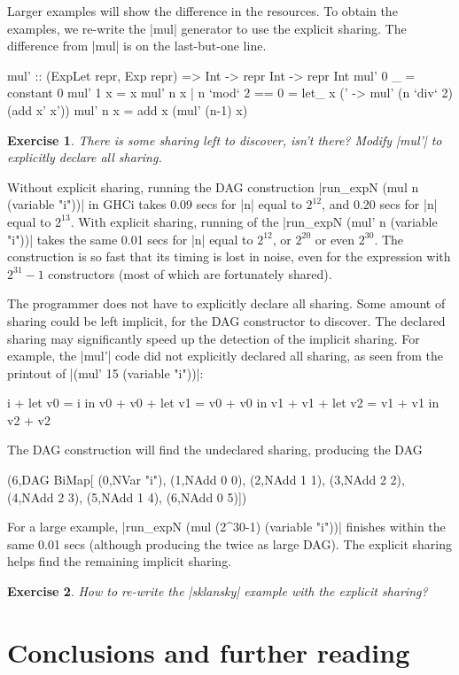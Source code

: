\documentclass[submission,copyright,creativecommons]{eptcs}
\newtheorem{Exercise}{Exercise} \newcommand\aside[1]{}
\begin{document}
Larger examples will show the difference in the resources. To
obtain the examples, we re-write the |mul| generator to use the
explicit sharing.  The difference from |mul| is on the last-but-one
line.
\begin{code}
mul' :: (ExpLet repr, Exp repr) => Int -> repr Int -> repr Int
mul' 0 _ = constant 0
mul' 1 x = x
mul' n x | n `mod` 2 == 0 = let_ x (\x' -> mul' (n `div` 2) (add x' x'))
mul' n x = add x (mul' (n-1) x)
\end{code}
\begin{Exercise}
There is some sharing left to discover, isn't there?
Modify |mul'| to explicitly declare all sharing.
\end{Exercise}
Without explicit sharing, running the DAG construction 
|run_expN (mul n (variable "i"))| in GHCi takes 0.09 secs for
|n| equal to $2^{12}$, and 0.20 secs for |n| equal to $2^{13}$.
With explicit sharing, running of the
|run_expN (mul' n (variable "i"))| takes the same 0.01 secs
for |n| equal to $2^{12}$, or $2^{20}$ or even $2^{30}$. The
construction is so fast that its timing is lost in noise, even for
the expression with $2^{31}-1$ constructors (most of which are
fortunately shared).

The programmer does not have to explicitly declare all sharing. Some
amount of sharing could be left implicit, for the DAG constructor to
discover. The declared sharing may significantly speed up the
detection of the implicit sharing. For example, the |mul'| code did
not explicitly declared all sharing, as seen from the printout of
|(mul' 15 (variable "i"))|:
\begin{code}
i + let v0 = i in v0 + v0 + 
      let v1 = v0 + v0 in v1 + v1 + let v2 = v1 + v1 in v2 + v2
\end{code}
The DAG construction will find the undeclared sharing, producing the DAG
\begin{code}
(6,DAG BiMap[
   (0,NVar "i"),
   (1,NAdd 0 0), (2,NAdd 1 1), (3,NAdd 2 2),
   (4,NAdd 2 3), (5,NAdd 1 4), (6,NAdd 0 5)])
\end{code}
For a large example, |run_expN (mul (2^30-1) (variable "i"))| finishes
within the same 0.01 secs (although producing the twice as large DAG). The
explicit sharing helps find the remaining implicit sharing.

\begin{Exercise}
How to re-write the |sklansky| example with the explicit sharing?
\end{Exercise}

\section{Conclusions and further reading}
\label{s:concl}
\end{document}
